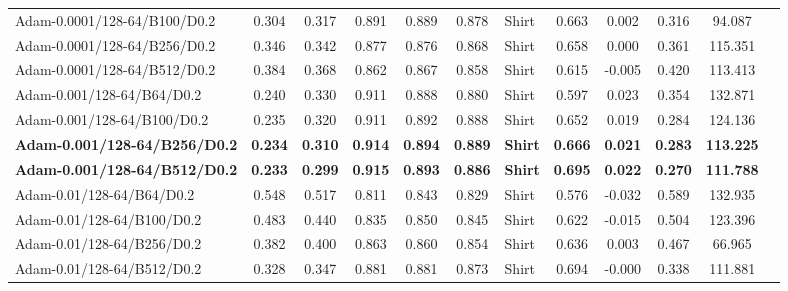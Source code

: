 \begin{table}[!b]
{\begin{tabular}{lccccclccccc}
Adam-0.0001/128-64/B100/D0.2 & 0.304 & 0.317 & 0.891 & 0.889 & 0.878 & Shirt & 0.663 & 0.002 & 0.316 & 94.087 \\
Adam-0.0001/128-64/B256/D0.2 & 0.346 & 0.342 & 0.877 & 0.876 & 0.868 & Shirt & 0.658 & 0.000 & 0.361 & 115.351 \\
Adam-0.0001/128-64/B512/D0.2 & 0.384 & 0.368 & 0.862 & 0.867 & 0.858 & Shirt & 0.615 & -0.005 & 0.420 & 113.413 \\
\midrule
Adam-0.001/128-64/B64/D0.2 & 0.240 & 0.330 & 0.911 & 0.888 & 0.880 & Shirt & 0.597 & 0.023 & 0.354 & 132.871 \\
Adam-0.001/128-64/B100/D0.2 & 0.235 & 0.320 & 0.911 & 0.892 & 0.888 & Shirt & 0.652 & 0.019 & 0.284 & 124.136 \\
\textbf{Adam-0.001/128-64/B256/D0.2} & \textbf{0.234} & \textbf{0.310} & \textbf{0.914} & \textbf{0.894} & \textbf{0.889} & \textbf{Shirt} & \textbf{0.666} & \textbf{0.021} & \textbf{0.283} & \textbf{113.225} \\
\textbf{Adam-0.001/128-64/B512/D0.2} & \textbf{0.233} & \textbf{0.299} & \textbf{0.915} & \textbf{0.893} & \textbf{0.886} & \textbf{Shirt} & \textbf{0.695} & \textbf{0.022} & \textbf{0.270} & \textbf{111.788} \\
\midrule
Adam-0.01/128-64/B64/D0.2 & 0.548 & 0.517 & 0.811 & 0.843 & 0.829 & Shirt & 0.576 & -0.032 & 0.589 & 132.935 \\
Adam-0.01/128-64/B100/D0.2 & 0.483 & 0.440 & 0.835 & 0.850 & 0.845 & Shirt & 0.622 & -0.015 & 0.504 & 123.396 \\
Adam-0.01/128-64/B256/D0.2 & 0.382 & 0.400 & 0.863 & 0.860 & 0.854 & Shirt & 0.636 & 0.003 & 0.467 & 66.965 \\
Adam-0.01/128-64/B512/D0.2 & 0.328 & 0.347 & 0.881 & 0.881 & 0.873 & Shirt & 0.694 & -0.000 & 0.338 & 111.881 \\
\bottomrule
\end{tabular}%
}
\end{table}
